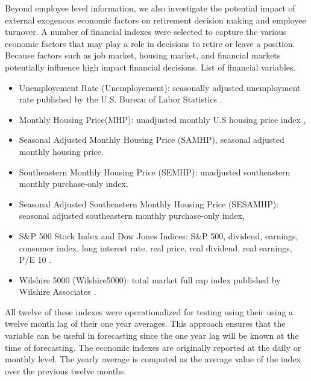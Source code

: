 \documentclass[12pt,letterpaper]{article}
\begin{document}
Beyond employee level information, we also investigate the potential impact of external exogenous economic factors on retirement decision making and employee turnover.  A number of financial indexes were selected to capture the various economic factors that may play a role in decisions to retire or leave a position.  Because factors such as job market, housing market, and financial markets potentially influence high impact financial decisions.
List of financial variables.
\begin{itemize}
	\item Unemployement Rate (Unemployement): seasonally adjusted unemployment rate published by the U.S. Bureau of Labor Statistics \citep{unemployment}.
	\item Monthly Housing Price(MHP): unadjusted monthly U.S housing price index \citep{HPI},
	\item Seasonal Adjusted Monthly Housing Price (SAMHP), seasonal adjusted monthly housing price.
	\item Southeastern Monthly Housing Price (SEMHP): unadjusted southeastern monthly purchase-only index.
	\item Seasonal Adjusted Southeastern Monthly Housing Price (SESAMHP): seasonal adjusted southeastern monthly purchase-only index,
	\item S\&P 500 Stock Index and Dow Jones Indices: S\&P 500, dividend, earnings, consumer index, long interest rate, real price, real dividend, real earnings, P/E 10 \citep{sp500}.
    \item Wilshire 5000 (Wilshire5000): total market full cap index published by Wilshire Associates \citep{will5000}.
\end{itemize}
All twelve of these indexes were operationalized for testing using their using a twelve month lag of their one year averages.  This approach ensures that the variable can be useful in forecasting since the one year lag will be known at the time of forecasting. The economic indexes are originally reported at the daily or monthly level. The yearly average is computed as the average value of the index over the previous twelve months.

\end{document}
